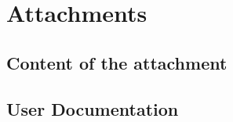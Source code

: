 \documentclass[12pt,a4paper]{report}
\begin{document}



\tableofcontents













\listoffigures

\listoftables


\appendix
\chapter{Attachments}

\section{Content of the attachment}

\section{User Documentation}
\end{document}
